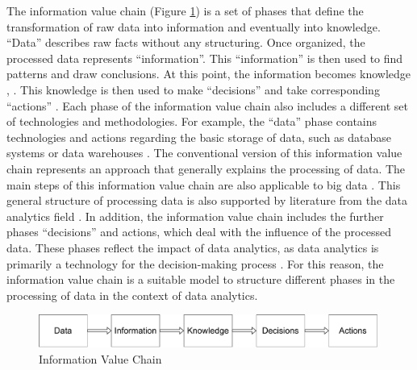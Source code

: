The information value chain (Figure \ref{information_value_chain}) is a set of phases that define the transformation of raw data into information and eventually into knowledge. \enquote{Data} describes raw facts without any structuring. Once organized, the processed data represents \enquote{information}. This \enquote{information} is then used to find patterns and draw conclusions. At this point, the information becomes knowledge \parencite{Fayyad.1996}, \cite{Fayyad.1996b}. This knowledge is then used to make \enquote{decisions} and take corresponding \enquote{actions} \parencite{Sharma.2014}. Each phase of the information value chain also includes a different set of technologies and methodologies. For example, the \enquote{data} phase contains technologies and actions regarding the basic storage of data, such as database systems or data warehouses \parencite{Abbasi.2016}. The conventional version of this information value chain represents an approach that generally explains the processing of data. The main steps of this information value chain are also applicable to big data \parencite{Abbasi.2016}. This general structure of processing data is also supported by literature from the data analytics field \parencite{Runkler.2020}. In addition, the information value chain includes the further phases \enquote{decisions} and {actions}, which deal with the influence of the processed data. These phases reflect the impact of data analytics, as data analytics is primarily a technology for the decision-making process \parencite{Runkler.2020}. For this reason, the information value chain is a suitable model to structure different phases in the processing of data in the context of data analytics.

\begin{figure}[htbp]
    \includegraphics[width=0.99\textwidth, keepaspectratio]{content/02_theretical_foundations/informationValueChain.pdf}
    \caption{Information Value Chain}    
    \label{information_value_chain}
\end{figure}


